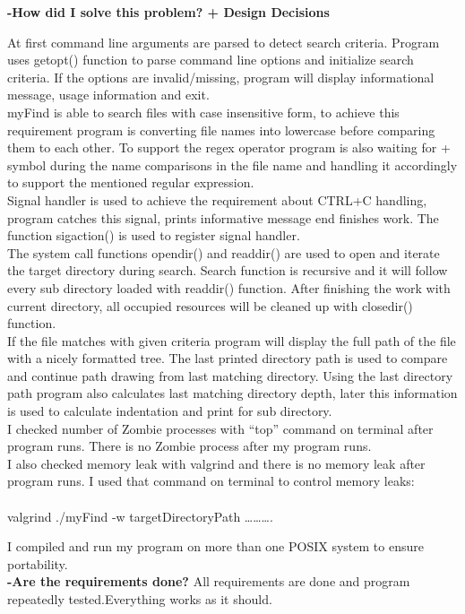 \documentclass[a4 paper]{article}
\begin{document}
{\color{red}\large\textbf {-How did I solve this problem? + Design Decisions}} 

\phantom{beta} At first command line arguments are parsed to detect search criteria. Program uses getopt() function to parse command line options and initialize search criteria. If the options are invalid/missing, program will display informational message, usage information and exit.\\

\phantom{beta} myFind is able to search files with case insensitive form, to achieve this requirement program is converting file names into lowercase before comparing them to each other. To support the regex operator program is also waiting for + symbol during the name comparisons in the file name and handling it accordingly to support the mentioned regular expression.\\


\phantom{beta} Signal handler is used to achieve the requirement about CTRL+C handling, program catches this signal, prints informative message end finishes work. The function sigaction() is used to register signal handler.\\

\phantom{beta} The system call functions opendir() and readdir() are used to open and iterate the target directory during search. Search function is recursive and it will follow every sub directory loaded with readdir() function. After finishing the work with current directory, all occupied resources will be cleaned up with closedir() function.\\

\phantom{beta} If the file matches with given criteria program will display the full path of the file with a nicely formatted tree. The last printed directory path is used to compare and continue path drawing from last matching directory. Using the last directory path program also calculates last matching directory depth, later this information is used to calculate indentation and print for sub directory.\\

\phantom{beta} I checked number of Zombie processes with “top” command on terminal after program runs. There is no Zombie process after my program runs.\\

\phantom{beta} I also checked memory leak with valgrind and there is no memory leak after program runs. I used that command on terminal to control memory leaks:\\\\
\phantom{beta}\phantom{beta}valgrind ./myFind -w targetDirectoryPath ……….

\phantom{beta} I compiled and run my program on more than one POSIX system to ensure portability.\\

{\color{red}\large\textbf {-Are the requirements done?}}\newline
\phantom{beta} All requirements are done and program repeatedly tested.Everything works as it should.\\
\end{document}
